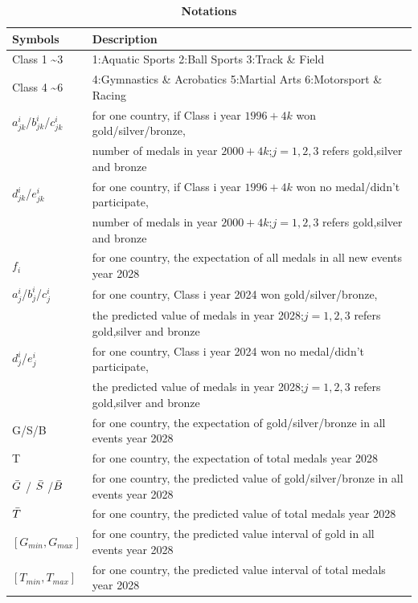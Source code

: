 \documentclass{mcmthesis}  %
\begin{document}
\begin{table}[H]
\caption{\textbf{Notations}} %
\centering %
\begin{tabular}{ll} %
\toprule %
\textbf{Symbols} & \textbf{Description} \\
\midrule %
Class 1 \textasciitilde  3  & 
1:Aquatic Sports 2:Ball Sports 3:Track \& Field  \\
Class 4 \textasciitilde  6  & 
4:Gymnastics \& Acrobatics 5:Martial Arts 6:Motorsport \& Racing \\

$a_{jk}^i$/$b_{jk}^i$/$c_{jk}^i$ & for one country, if Class i year $1996+4k$ won gold/silver/bronze, \\
&number of medals in year $2000+4k$;$j=1,2,3$ refers gold,silver and bronze \\

$d_{jk}^i$/$e_{jk}^i$ & for one country, if Class i year $1996+4k$ won no medal/didn't participate, \\
&number of medals in year $2000+4k$;$j=1,2,3$ refers gold,silver and bronze \\

$f_i$ & for one country, the expectation of all medals in all new events year 2028 \\

$a_{j}^i$/$b_{j}^i$/$c_{j}^i$ & for one country,  Class i year 2024 won gold/silver/bronze, \\
&the predicted value of medals in year 2028;$j=1,2,3$ refers gold,silver and bronze \\


$d_{j}^i$/$e_{j}^i$ & for one country,  Class i year 2024 won no medal/didn't participate, \\
&the predicted value of medals in year 2028;$j=1,2,3$ refers gold,silver and bronze \\

G/S/B & for one country, the expectation of gold/silver/bronze in all events year 2028 \\
T & for one country, the expectation of total medals year 2028\\

$\Bar{G}$ / $\Bar{S}$ /$\Bar{B}$ & for one country, the predicted value of gold/silver/bronze in all events year 2028 \\ 
$\Bar{T}$ & for one country, the predicted value of total medals year 2028 \\
$[G_{min},G_{max}]$ & for one country, the predicted value interval of gold in all events year 2028 \\
$[T_{min},T_{max}]$ & for one country, the predicted value interval of total medals year 2028 \\


\end{tabular}
\end{table}
\end{document}
